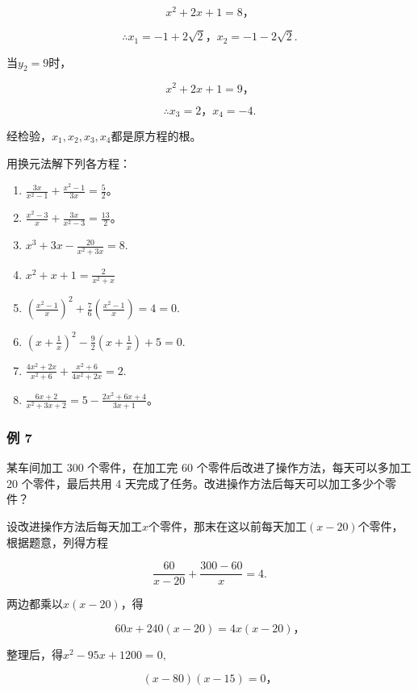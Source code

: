 \[
x ^ {2} + 2 x + 1 = 8\text{，}
\]

\[
\therefore x _ {1} = - 1 + 2 \sqrt {2}\text{，} x _ {2} = - 1 - 2 \sqrt {2}.
\]

当\(y_{2} = 9\)时，

\[
x ^ {2} + 2 x + 1 = 9\text{，}
\]

\[
\therefore x _ {3} = 2\text{，} x _ {4} = - 4.
\]

经检验，\(x_{1}, x_{2}, x_{3}, x_{4}\)都是原方程的根。

用换元法解下列各方程：

\begin{enumerate}[start=1]
\item
  \(\frac{3x}{x^2 - 1} + \frac{x^2 - 1}{3x} = \frac{5}{2}\)。
\item
  \(\frac{x^2 - 3}{x} + \frac{3x}{x^2 - 3} = \frac{13}{2}\)。
\item
  \(x^{3} + 3x - \frac{20}{x^{2} + 3x} = 8.\)
\item
  \(x^{2} + x + 1 = \frac{2}{x^{2} + x}\)
\item
  \(\left(\frac{x^2 - 1}{x}\right)^2 + \frac{7}{6}\left(\frac{x^2 - 1}{x}\right) = 4 = 0.\)
\item
  \(\left(x + \frac{1}{x}\right)^2 - \frac{9}{2}\left(x + \frac{1}{x}\right) + 5 = 0.\)
\item
  \(\frac{4x^2 + 2x}{x^2 + 6} + \frac{x^2 + 6}{4x^2 + 2x} = 2.\)
\item
  \(\frac{6x + 2}{x^2 + 3x + 2} = 5 - \frac{2x^2 + 6x + 4}{3x + 1}\)。
\end{enumerate}

\subsubsection{例 7}

某车间加工 300 个零件，在加工完 60
个零件后改进了操作方法，每天可以多加工 20 个零件，最后共用 4
天完成了任务。改进操作方法后每天可以加工多少个零件？

设改进操作方法后每天加工\(x\)个零件，那末在这以前每天加工\((x - 20)\)个零件，根据题意，列得方程

\[
\frac{60}{x - 20} + \frac{300 - 60}{x} = 4.
\]

两边都乘以\(x(x - 20)\)，得

\[
60 x + 240 (x - 20) = 4 x (x - 20)\text{，}
\]

整理后，得\(x^{2} - 95x + 1200 = 0,\)

\[
(x - 80) (x - 15) = 0\text{，}
\]

